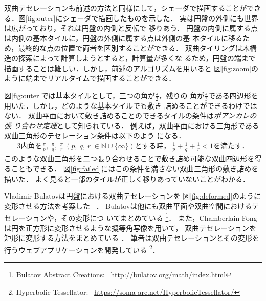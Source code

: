 双曲テセレーションも前述の方法と同様にして，シェーダで描画することができ
る．図\ref{fig:outer}にシェーダで描画したものを示した．
実は円盤の外側にも世界は広がっており，それは円盤の内側と反転で
移りあう．
円盤の内側に属する点は内側の基本タイルに，円盤の外側に属する点は外側の基
本タイルに移るため，最終的な点の位置で両者を区別することができる．
双曲タイリングは木構造の探索によって計算しようとすると，計算量が多くな
るため，円盤の端まで描画することは難しい．しかし，前述のアルゴリズムを用いると
図\ref{fig:zoom}のように端までリアルタイムで描画することができる．

図\ref{fig:outer}では基本タイルとして，三つの角が$\frac{\pi}{2}$，残りの
角が$\frac{\pi}{3}$である四辺形を用いた．しかし，どのような基本タイルでも敷き
詰めることができるわけではない．
双曲平面において敷き詰めることのできるタイルの条件は\emph{ポアンカレの張
り合わせ定理}として知られている．
例えば，双曲平面における三角形である双曲三角形のテセレーション条件は以下のよう
になる．
\begin{eqnarray*}
3\text{内角を}\frac{\pi}{p},~\frac{\pi}{q},~\frac{\pi}{r}~(p,~q,~r~\in
 \mathbb{N} \cup \{\infty\}) \text{とする時，}~
 \frac{1}{p} + \frac{1}{q} + \frac{1}{r} < 1 \text{を満たす．}
\end{eqnarray*}
このような双曲三角形を二つ張り合わせることで敷き詰め可能な双曲四辺形を得
ることもできる．
図\ref{fig:failed}にはこの条件を満さない双曲三角形の敷き詰めを描いた．
よく見ると一部のタイルが正しく移りあっていないことがわかる．

Vladimir Bulatovは円盤における双曲テセレーションを
図\ref{fig:deformed}のように変形させる方法を考案した
\cite{bridges2013-167}~\cite{bridges2011-479}．
Bulatovは他にも双曲平面や双曲空間におけるテセレーションや，その変形につ
いてまとめている
\footnote{Bulatov Abstract Creations:~
\url{http://bulatov.org/math/index.html}}．
また，Chamberlain Fongは円を正方形に変形させるような擬等角写像を用いて，
双曲テセレーションを矩形に変形する方法をまとめている
\cite{bridges2016-179}．
筆者は双曲テセレーションとその変形を行うウェブアプリケーションを開発している
\footnote{Hyperbolic Tessellator:~
\url{https://soma-arc.net/HyperbolicTessellator/}}．

